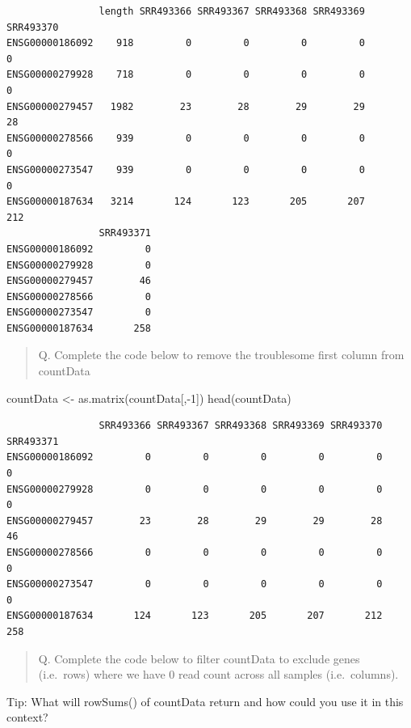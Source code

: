 \documentclass[
  letterpaper,
  DIV=11,
  numbers=noendperiod]{scrartcl}
\newenvironment{Shaded}{\begin{snugshade}}{\end{snugshade}}
\newcommand{\DecValTok}[1]{\textcolor[rgb]{0.68,0.00,0.00}{#1}}
\newcommand{\FunctionTok}[1]{\textcolor[rgb]{0.28,0.35,0.67}{#1}}
\newcommand{\NormalTok}[1]{\textcolor[rgb]{0.00,0.23,0.31}{#1}}
\newcommand{\OtherTok}[1]{\textcolor[rgb]{0.00,0.23,0.31}{#1}}
\newcommand{\SpecialCharTok}[1]{\textcolor[rgb]{0.37,0.37,0.37}{#1}}
\begin{document}
\begin{verbatim}
                length SRR493366 SRR493367 SRR493368 SRR493369 SRR493370
ENSG00000186092    918         0         0         0         0         0
ENSG00000279928    718         0         0         0         0         0
ENSG00000279457   1982        23        28        29        29        28
ENSG00000278566    939         0         0         0         0         0
ENSG00000273547    939         0         0         0         0         0
ENSG00000187634   3214       124       123       205       207       212
                SRR493371
ENSG00000186092         0
ENSG00000279928         0
ENSG00000279457        46
ENSG00000278566         0
ENSG00000273547         0
ENSG00000187634       258
\end{verbatim}

\begin{quote}
Q. Complete the code below to remove the troublesome first column from
countData
\end{quote}

\begin{Shaded}
\begin{Highlighting}[]
\NormalTok{countData }\OtherTok{\textless{}{-}} \FunctionTok{as.matrix}\NormalTok{(countData[,}\SpecialCharTok{{-}}\DecValTok{1}\NormalTok{])}
\FunctionTok{head}\NormalTok{(countData)}
\end{Highlighting}
\end{Shaded}

\begin{verbatim}
                SRR493366 SRR493367 SRR493368 SRR493369 SRR493370 SRR493371
ENSG00000186092         0         0         0         0         0         0
ENSG00000279928         0         0         0         0         0         0
ENSG00000279457        23        28        29        29        28        46
ENSG00000278566         0         0         0         0         0         0
ENSG00000273547         0         0         0         0         0         0
ENSG00000187634       124       123       205       207       212       258
\end{verbatim}

\begin{quote}
Q. Complete the code below to filter countData to exclude genes
(i.e.~rows) where we have 0 read count across all samples
(i.e.~columns).
\end{quote}

Tip: What will rowSums() of countData return and how could you use it in
this context?
\end{document}
